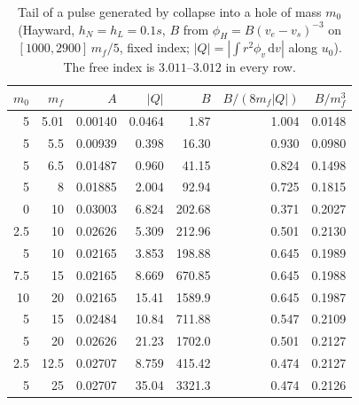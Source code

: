 \documentclass[11pt]{article}
\begin{document}
\begin{table}[ht]\centering\small
\begin{tabular}{rrrrrrr}
\hline
$m_0$ & $m_f$ & $A$ & $|Q|$ & $B$ & $B/(8m_f|Q|)$ & $B/m_f^{3}$\\
\hline
5 & 5.01 & 0.00140 & 0.0464 & 1.87 & 1.004 & 0.0148\\
5 & 5.5 & 0.00939 & 0.398 & 16.30 & 0.930 & 0.0980\\
5 & 6.5 & 0.01487 & 0.960 & 41.15 & 0.824 & 0.1498\\
5 & 8 & 0.01885 & 2.004 & 92.94 & 0.725 & 0.1815\\
0 & 10 & 0.03003 & 6.824 & 202.68 & 0.371 & 0.2027\\
2.5 & 10 & 0.02626 & 5.309 & 212.96 & 0.501 & 0.2130\\
5 & 10 & 0.02165 & 3.853 & 198.88 & 0.645 & 0.1989\\
7.5 & 15 & 0.02165 & 8.669 & 670.85 & 0.645 & 0.1988\\
10 & 20 & 0.02165 & 15.41 & 1589.9 & 0.645 & 0.1987\\
5 & 15 & 0.02484 & 10.84 & 711.88 & 0.547 & 0.2109\\
5 & 20 & 0.02626 & 21.23 & 1702.0 & 0.501 & 0.2127\\
2.5 & 12.5 & 0.02707 & 8.759 & 415.42 & 0.474 & 0.2127\\
5 & 25 & 0.02707 & 35.04 & 3321.3 & 0.474 & 0.2126\\
\hline
\end{tabular}
\caption{Tail of a pulse generated by collapse into a hole of mass $m_0$ (Hayward, $h_N=h_L=0.1s$, $B$ from $\phi_H=B(v_e-v_s)^{-3}$ on $[1000,2900]\,m_f/5$, fixed index; $|Q|=|\int r^{2}\phi_v\,\mathrm dv|$ along $u_0$). The free index is $3.011$--$3.012$ in every row.}\label{tab:strong}
\end{table}
\end{document}
